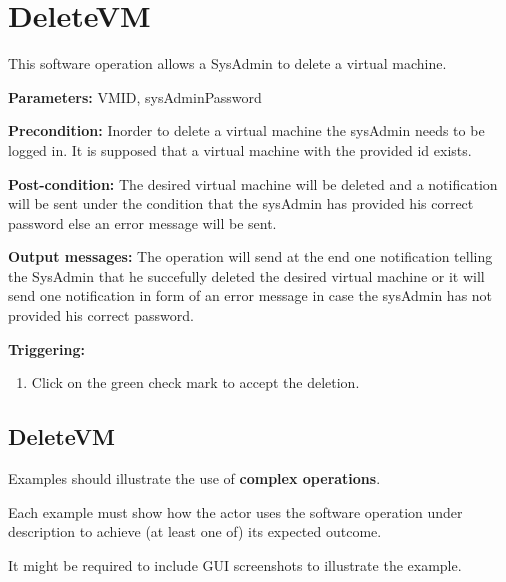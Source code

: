 \section{DeleteVM}
\label{operation:DeleteVM}
This software operation allows a SysAdmin to delete a virtual machine. 
\begin{description}

\item \textbf{Parameters:} VMID, sysAdminPassword
\item \textbf{Precondition:} Inorder to delete a virtual machine the sysAdmin
needs to be logged in. It is supposed that a virtual machine with the provided
id exists.

\item \textbf{Post-condition:} The desired virtual machine will be deleted and a
notification will be sent under the condition that the sysAdmin has provided his
correct password else an error message will be sent.
\item \textbf{Output messages:} The operation will send at the end one
notification telling the SysAdmin that he succefully deleted the desired
virtual machine or it will send one notification in form of an error message in
case the sysAdmin has not provided his correct password.

\item \textbf{Triggering:}
\begin{enumerate}
\item Click on the green check mark to accept the deletion.
\end{enumerate}

 
\end{description}

 
\subsection{DeleteVM}
Examples should illustrate the use of \textbf{complex operations}.

Each example must show how the actor uses the software operation under
description to achieve (at least one of) its expected outcome.

It might be required to include GUI screenshots to illustrate the example.











